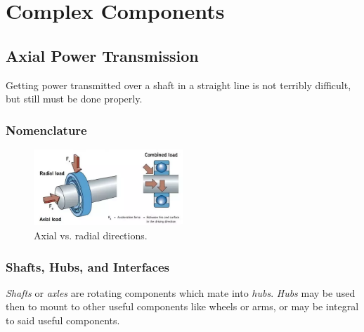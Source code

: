 \chapter{Complex Components}

\section{Axial Power Transmission}

Getting power transmitted over a shaft in a straight line is not terribly difficult, but still must be done properly.

\subsection{Nomenclature}

\begin{figure}[H]
\includegraphics[width=0.5\textwidth]{imgs/radial_axial.png}
\caption{Axial vs. radial directions.}
\end{figure}

\subsection{Shafts, Hubs, and Interfaces}
	
	\textit{Shafts} or \textit{axles} are rotating components which mate into \textit{hubs}. \textit{Hubs} may be used then to mount to other useful components like wheels or arms, or may be integral to said useful components.


